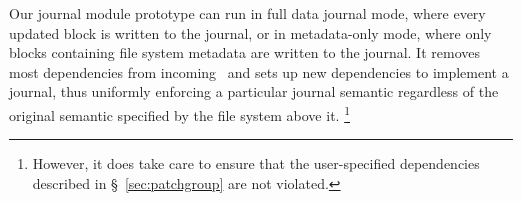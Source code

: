 \begin{comment}
Our journal module prototype ignores incoming dependencies
and enforces transactions based on high-level file system operations.
%
It thus uniformly enforces a particular journal semantic---namely, that
each file system operation happens atomically---regardless of the semantics
specified by the file system above it.
%
It should be possible, however, to extend the journal module to obey
dependencies.
\end{comment}


Our journal module prototype can run in full data journal mode, where every
updated block is written to the journal, or in metadata-only mode, where only
blocks containing file system metadata are written to the journal. It removes
most dependencies from incoming \patches\ and sets up new dependencies to
implement a journal, thus uniformly enforcing a particular journal semantic
regardless of the original semantic specified by the file system above it.
\footnote{However, it does take care to ensure that the user-specified
dependencies described in \S~\ref{sec:patchgroup} are not violated.}
